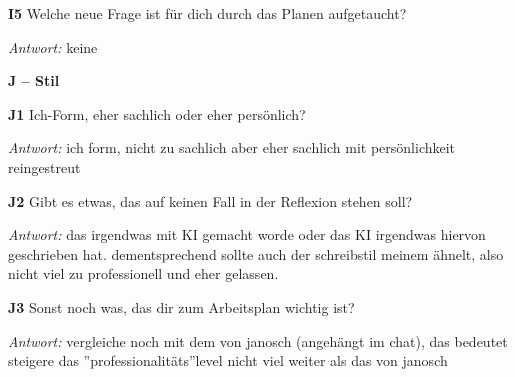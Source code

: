 {\par\noindent \textbf{I5} Welche neue Frage ist für dich durch das Planen aufgetaucht?\par
\par\noindent\emph{Antwort:} keine\par\smallskip
\par\medskip\noindent\textbf{J – Stil}\par
\par\noindent \textbf{J1} Ich-Form, eher sachlich oder eher persönlich?\par
\par\noindent\emph{Antwort:} ich form, nicht zu sachlich aber eher sachlich mit persönlichkeit reingestreut\par\smallskip
\par\noindent \textbf{J2} Gibt es etwas, das auf keinen Fall in der Reflexion stehen soll?\par
\par\noindent\emph{Antwort:} das irgendwas mit KI gemacht worde oder das KI irgendwas hiervon geschrieben hat. dementsprechend sollte auch der schreibstil meinem ähnelt, also nicht viel zu professionell und eher gelassen.\par\smallskip
\par\noindent \textbf{J3} Sonst noch was, das dir zum Arbeitsplan wichtig ist?\par
\par\noindent\emph{Antwort:} vergleiche noch mit dem von janosch (angehängt im chat), das bedeutet steigere das ''professionalitäts''level nicht viel weiter als das von janosch\par\smallskip
}
